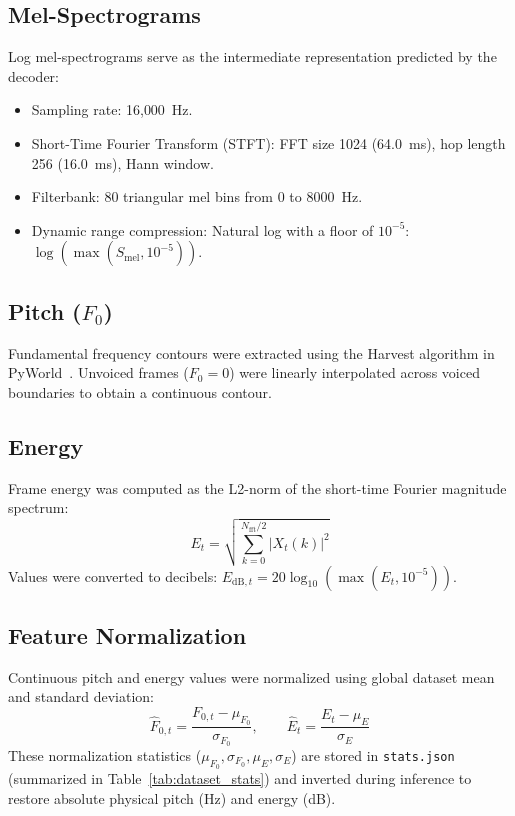 \documentclass[11pt,a4paper]{report}
\begin{document}
\subsection{Mel-Spectrograms}
Log mel-spectrograms serve as the intermediate representation predicted by the decoder:
\begin{itemize}
    \item Sampling rate: 16{,}000~Hz.
    \item Short-Time Fourier Transform (STFT): FFT size 1024 (64.0~ms), hop length 256 (16.0~ms), Hann window.
    \item Filterbank: 80 triangular mel bins from 0 to 8000~Hz.
    \item Dynamic range compression: Natural log with a floor of $10^{-5}$: $\log(\max(S_{\text{mel}}, 10^{-5}))$.
\end{itemize}

\subsection{Pitch ($F_0$)}
Fundamental frequency contours were extracted using the Harvest algorithm in PyWorld~\cite{pyworld}. Unvoiced frames ($F_0 = 0$) were linearly interpolated across voiced boundaries to obtain a continuous contour.

\subsection{Energy}
Frame energy was computed as the L2-norm of the short-time Fourier magnitude spectrum:
\begin{equation}
    E_t = \sqrt{\sum_{k=0}^{N_{\text{fft}}/2} |X_t(k)|^2}
\end{equation}
Values were converted to decibels: $E_{\text{dB}, t} = 20\log_{10}(\max(E_t, 10^{-5}))$.

\subsection{Feature Normalization}
Continuous pitch and energy values were normalized using global dataset mean and standard deviation:
\begin{equation}
    \hat{F}_{0,t} = \frac{F_{0,t} - \mu_{F_0}}{\sigma_{F_0}}, \qquad \hat{E}_t = \frac{E_t - \mu_E}{\sigma_E}
\end{equation}
These normalization statistics ($\mu_{F_0}, \sigma_{F_0}, \mu_E, \sigma_E$) are stored in \texttt{stats.json} (summarized in Table~\ref{tab:dataset_stats}) and inverted during inference to restore absolute physical pitch (Hz) and energy (dB).
\end{document}
